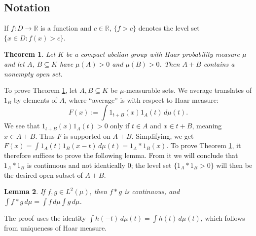 \documentclass[12pt]{amsart} \usepackage{amsmath,centernot,amssymb,leftindex}
\newtheorem{theorem}{Theorem}
\newtheorem{lemma}[theorem]{Lemma}
\numberwithin{theorem}{section}
\numberwithin{equation}{section}
\theoremstyle{definition}
\begin{document}
\subsection{Notation} If $f:D\to \mathbb R$ is a function and $c\in \mathbb R$, $\{f>c\}$ denotes the level set $\{x\in D: f(x)>c\}$.

	\begin{theorem}\label{th:SteinhausCompactAbelian}Let $K$ be a compact abelian group with Haar probability measure $\mu$ and let $A$, $B\subseteq K$ have $\mu(A)>0$ and  $\mu(B)>0$.  Then $A+B$ contains a nonempty open set.
	\end{theorem}
 
	

To prove Theorem \ref{th:SteinhausCompactAbelian}, let $A, B\subseteq K$ be $\mu$-measurable sets.  We average translates of $1_B$ by elements of $A$, where ``average'' is with respect to Haar measure:
	\[
	F(x):=\int 1_{t+B}(x)1_A(t)\, d\mu(t).
	\]
	We see that $1_{t+B}(x)1_{A}(t)>0$ only if  $t\in A$ and $x\in t+B$, meaning $x\in A+B$.  Thus $F$ is supported on $A+B$. Simplifying, we get  $F(x)=\int 1_{A}(t)1_B(x-t)\, d\mu(t)=1_{A}*1_{B}(x)$. To prove Theorem \ref{th:SteinhausCompactAbelian}, it therefore suffices to prove the following lemma.  From it we will conclude that  $1_A*1_B$ is continuous and not identically $0$; the level set $\{1_{A}*1_{B}>0\}$ will then be the desired open subset of $A+B$.
	
\begin{lemma}\label{lem:ConvolutionIsContinuous}
	If $f, g\in L^{2}(\mu)$, then $f*g$ is continuous, and $\int f*g\, d\mu=\int f\, d\mu \int g \, d\mu$.
\end{lemma}	
	
The proof uses the identity $\int h(-t)\, d\mu(t)=\int h(t)\, d\mu(t)$, which follows from uniqueness of Haar measure.	
	
\end{document}
